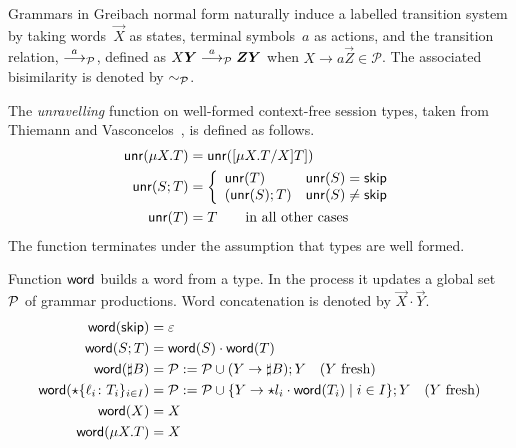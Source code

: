 
Grammars in Greibach normal form naturally induce a labelled
transition system by taking words~$\vec X$ as states, terminal
symbols~$a$ as actions, and the transition relation, $\stackrel{a}{\longrightarrow}_\mathcal P$,
defined as $X\vec Y\LTSderivesP \vec Z\vec Y$ when
$X \rightarrow a\vec Z \in \mathcal P$.  The associated bisimilarity
is denoted by $\sim_\mathcal P$.


The \emph{unravelling} function on well-formed context-free session
types, taken from Thiemann and Vasconcelos~\cite{thiemann2016context},
is defined as follows.
%
\begin{align*}
  \Unravel(\mu X.T) & = \Unravel(\subs{\mu X.T}XT])
  \\
  \Unravel (S;T) &= \left\{%
  \begin{array}{ll}
    \Unravel(T) & \Unravel(S) = \skipk
    \\
    (\Unravel(S); T) & \Unravel(S) \ne \skipk
  \end{array}
                        \right.
  \\
  \Unravel (T) &= T \qquad \text{in all other cases}
\end{align*}
%
The function terminates under the assumption that types are well
formed. 


Function $\mathsf{word}$ builds a word from a type. In the process it updates a
global set $\mathcal P$ of grammar productions. Word concatenation is
denoted by $\vec X\cdot\vec Y$.
%
\begin{align*}
  \mathsf{word}(\mathsf{skip}) &= \varepsilon
  \\
  \mathsf{word}(S;T) &= \mathsf{word}(S) \cdot \mathsf{word}(T)
  \\
  \mathsf{word}(\sharp B) &=
    \mathcal P := \mathcal P \cup (Y \rightarrow \sharp B); Y
    \quad (Y\text{ fresh})
  \\
  \mathsf{word}(\star\{\ell_i\colon T_i\}_{i\in I}) &=
    \mathcal P := \mathcal P \cup \{Y \rightarrow\star l_i\cdot \mathsf{word}(T_i) \mid i\in I\}; Y
    \quad (Y\text{ fresh})
  \\
  \mathsf{word}(X) &= X
  \\
  \mathsf{word}(\mu X.T) &= X
\end{align*}

